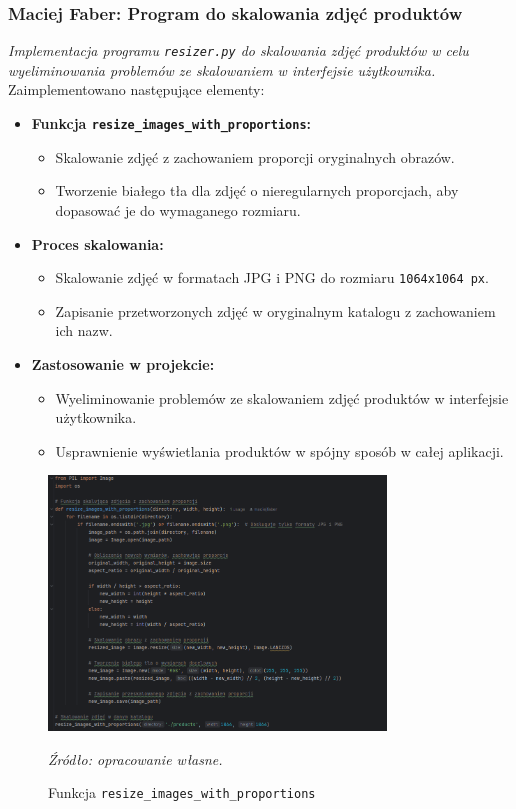 \documentclass[12pt,a4paper,oneside]{article}
\theoremstyle{definition}
\numberwithin{equation}{section}
\begin{document}
\subsubsection{Maciej Faber: Program do skalowania zdjęć produktów}
\label{section:1.3.54}
\textit{
Implementacja programu \texttt{resizer.py} do skalowania zdjęć produktów w celu wyeliminowania problemów ze skalowaniem w interfejsie użytkownika.
}
Zaimplementowano następujące elementy:
\begin{itemize}
    \item \textbf{Funkcja \texttt{resize\_images\_with\_proportions}:}
    \begin{itemize}
        \item Skalowanie zdjęć z zachowaniem proporcji oryginalnych obrazów.
        \item Tworzenie białego tła dla zdjęć o nieregularnych proporcjach, aby dopasować je do wymaganego rozmiaru.
    \end{itemize}
    \item \textbf{Proces skalowania:}
    \begin{itemize}
        \item Skalowanie zdjęć w formatach JPG i PNG do rozmiaru \texttt{1064x1064 px}.
        \item Zapisanie przetworzonych zdjęć w oryginalnym katalogu z zachowaniem ich nazw.
    \end{itemize}
    \item \textbf{Zastosowanie w projekcie:}
    \begin{itemize}
        \item Wyeliminowanie problemów ze skalowaniem zdjęć produktów w interfejsie użytkownika.
        \item Usprawnienie wyświetlania produktów w spójny sposób w całej aplikacji.
    \end{itemize}
\end{itemize}
\begin{figure}[H]
    \centering
    \includegraphics[width=0.8\textwidth]{images/krzysztofBImages/resizer_image.png}
    \caption{Funkcja \texttt{resize\_images\_with\_proportions}}
    \emph{Źródło: opracowanie własne.}
    \label{fig:image_resizing}
\end{figure}
\end{document}

